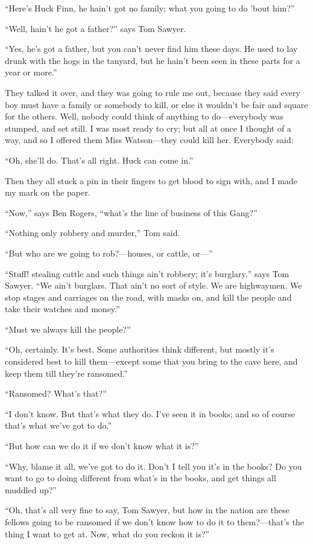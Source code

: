 \documentclass[10pt,a4paper]{article}
\begin{document}
“Here’s Huck Finn, he hain’t got no family; what you going to do ’bout him?”

“Well, hain’t he got a father?” says Tom Sawyer.

“Yes, he’s got a father, but you can’t never find him these days. He used to lay drunk with the hogs in the tanyard, but he hain’t been seen in these parts for a year or more.”

They talked it over, and they was going to rule me out, because they said every boy must have a family or somebody to kill, or else it wouldn’t be fair and square for the others. Well, nobody could think of anything to do—everybody was stumped, and set still. I was most ready to cry; but all at once I thought of a way, and so I offered them Miss Watson—they could kill her. Everybody said:

“Oh, she’ll do. That’s all right. Huck can come in.”

Then they all stuck a pin in their fingers to get blood to sign with, and I made my mark on the paper.

“Now,” says Ben Rogers, “what’s the line of business of this Gang?”

“Nothing only robbery and murder,” Tom said.

“But who are we going to rob?—houses, or cattle, or—”

“Stuff! stealing cattle and such things ain’t robbery; it’s burglary,” says Tom Sawyer. “We ain’t burglars. That ain’t no sort of style. We are highwaymen. We stop stages and carriages on the road, with masks on, and kill the people and take their watches and money.”

“Must we always kill the people?”

“Oh, certainly. It’s best. Some authorities think different, but mostly it’s considered best to kill them—except some that you bring to the cave here, and keep them till they’re ransomed.”

“Ransomed? What’s that?”

“I don’t know. But that’s what they do. I’ve seen it in books; and so of course that’s what we’ve got to do.”

“But how can we do it if we don’t know what it is?”

“Why, blame it all, we’ve got to do it. Don’t I tell you it’s in the books? Do you want to go to doing different from what’s in the books, and get things all muddled up?”

“Oh, that’s all very fine to say, Tom Sawyer, but how in the nation are these fellows going to be ransomed if we don’t know how to do it to them?—that’s the thing I want to get at. Now, what do you reckon it is?”
\end{document}
